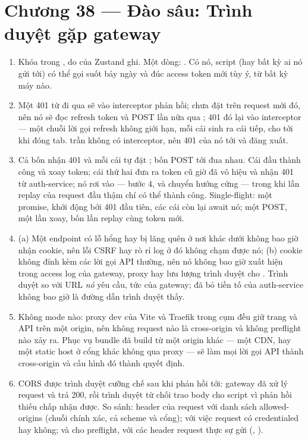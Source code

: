 \section*{Chương 38 --- Đào sâu: Trình duyệt gặp gateway}
\begin{enumerate}
  \item Khóa  trong , do
   của Zustand ghi. Một dòng:
  .
  Có nó, script (hay bất kỳ ai nó gửi tới) có thể gọi
   suốt bảy ngày và đúc access token mới tùy
  ý, từ bất kỳ máy nào.
  \item Một 401 từ  đi qua  sẽ vào
  interceptor phản hồi;  chưa đặt trên request mới đó,
  nên nó sẽ đọc refresh token và POST  lần nữa qua
  ; 401 đó lại vào interceptor --- một chuỗi lời gọi
  refresh không giới hạn, mỗi cái sinh ra cái tiếp, cho tới khi đóng
  tab.  trần không có interceptor, nên 401 của nó tới
   và đăng xuất.
  \item Cả bốn nhận 401 và mỗi cái tự đặt ; bốn POST tới
   đua nhau. Cái đầu thành công và xoay token; cái thứ
  hai đưa ra token cũ giờ đã vô hiệu và nhận 401 từ auth-service; nó
  rơi vào  --- bước 4,  và chuyển hướng
  cứng --- trong khi lần replay của request đầu thậm chí có thể thành
  công. Single-flight: một promise, khởi động bởi 401 đầu tiên, các
  cái còn lại await nó; một POST, một lần xoay, bốn lần replay cùng
  token mới.
  \item (a) Một endpoint có lỗ hổng hay bị lãng quên ở nơi khác dưới
   không bao giờ nhận cookie, nên lỗi CSRF hay rò rỉ log ở
  đó không chạm được nó; (b) cookie không đính kèm các lời gọi API
  thường, nên nó không bao giờ xuất hiện trong access log của gateway,
  proxy hay lưu lượng trình duyệt cho . Trình duyệt
  so  với URL \emph{nó} yêu cầu, tức
   của gateway;  đã bỏ tiền tố
  của auth-service không bao giờ là đường dẫn trình duyệt thấy.
  \item Không mode nào: proxy dev của Vite và Traefik trong cụm đều
  giữ trang và API trên một origin, nên không request nào là
  cross-origin và không preflight nào xảy ra. Phục vụ bundle đã build
  từ một origin khác --- một CDN, hay một static host ở cổng khác không
  qua proxy --- sẽ làm mọi lời gọi API thành cross-origin và cấu hình
  đó thành quyết định.
  \item CORS được trình duyệt cưỡng chế sau khi phản hồi tới: gateway
  đã xử lý request và trả 200, rồi trình duyệt từ chối trao body cho
  script vì phản hồi thiếu  chấp
  nhận được. So sánh: header  của request với danh sách
  allowed-origins (chuỗi chính xác, cả scheme và cổng);
   với việc request có
  credentialed hay không; và cho preflight,
   với các header request thực sự
  gửi (, ).
\end{enumerate}
